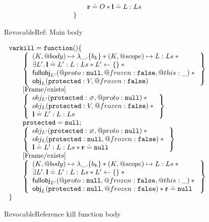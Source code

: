 \documentclass[a4paper]{article}
\begin{document}
\begin{figure}
\[\begin{array}{l}
\begin{array}{@{\qquad}l}
{        \rv \doteq O \sep \ls \doteq L : Ls
      }
    \end{array} \\
    \js{\}}
  \end{array}
\]
\caption{RevocableRef: Main body}
\label{rr-main}
\end{figure}

\begin{figure}
\[
  \begin{array}{l}
    \js{var kill = function() \{} \\
    \begin{array}{@{\qquad}l}
      \logic{
        (K, @body) \mapsto \lambda \_.\{b_k\} \sep (K, @scope) \mapsto L:Ls \sep {} \\
        \exists L' \st \ls \doteq L' : L : Ls \sep L' \bp \{\} \sep {} \\
        \fullobj_{L'}(@proto:\nil, @frozen:\false, @this:\_) \sep {} \\
        \obj_L(\js{protected}: V, @frozen: \false)
      } \\
      \step{Frame/exists} \\
      \logic{
        obj_{L'}(\js{protected}: \none, @proto: \nil) \sep {} \\
        obj_L(\js{protected}: V, @frozen: \false) \sep {} \\
        \ls \doteq L':L:Ls
      } \\
      \js{protected = null;} \\
      \logic{
        obj_{L'}(\js{protected}: \none, @proto: \nil) \sep {} \\
        obj_L(\js{protected}: \nil, @frozen: \false) \sep {} \\
        \ls \doteq L':L:Ls \sep \rv \doteq \nil
      } \\
      \step{Frame/exists} \\
      \logic{
        (K, @body) \mapsto \lambda \_.\{b_k\} \sep (K, @scope) \mapsto L:Ls \sep {} \\
        \exists L' \st \ls \doteq L' : L : Ls \sep L' \bp \{\} \sep {} \\
        \fullobj_{L'}(@proto:\nil, @frozen:\false, @this:\_) \sep {} \\
        \obj_L(\js{protected}: \nil, @frozen: \false) \sep \rv \doteq \nil
      } \\
    \end{array} \\
    \js{\}}
  \end{array}
\]
\caption{RevocableReference kill function body}
\label{rr-kill}
\end{figure}
\end{document}

